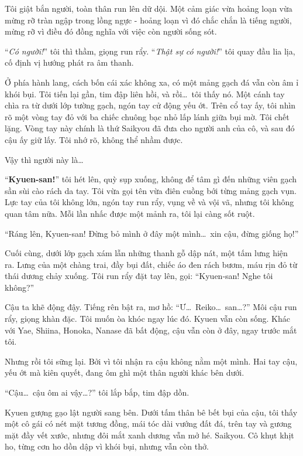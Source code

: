 \documentclass[../main.tex]{subfiles}
\begin{document}
Tôi giật bắn người, toàn thân run lên dữ dội. Một cảm giác vừa hoảng loạn vừa mừng rỡ tràn ngập trong lồng ngực - hoảng loạn vì đó chắc chắn là tiếng người, mừng rỡ vì điều đó đồng nghĩa với việc còn người sống sót.

``\textit{Có người!}'' tôi thì thầm, giọng run rẩy. ``\textit{Thật sự có người!}'' tôi quay đầu lia lịa, cố định vị hướng phát ra âm thanh.

Ở phía hành lang, cách bốn cái xác không xa, có một mảng gạch đá vẫn còn âm ỉ khói bụi. Tôi tiến lại gần, tim đập liên hồi, và rồi\dots\ tôi thấy nó. Một cánh tay chìa ra từ dưới lớp tường gạch, ngón tay cử động yếu ớt. Trên cổ tay ấy, tôi nhìn rõ một vòng tay đỏ với ba chiếc chuông bạc nhỏ lấp lánh giữa bụi mờ. Tôi chết lặng. Vòng tay này chính là thứ Saikyou đã đưa cho người anh của cô, và sau đó cậu ấy giữ lấy. Tôi nhớ rõ, không thể nhầm được.

Vậy thì người này là\dots

``\textbf{Kyuen-san!}'' tôi hét lên, quỳ sụp xuống, không để tâm gì đến những viên gạch sần sùi cào rách da tay. Tôi vừa gọi tên vừa điên cuồng bới từng mảng gạch vụn. Lực tay của tôi không lớn, ngón tay run rẩy, vụng về và vội vã, nhưng tôi không quan tâm nữa. Mỗi lần nhấc được một mảnh ra, tôi lại càng sốt ruột.

``Ráng lên, Kyuen-san! Đừng bỏ mình ở đây một mình\dots\ xin cậu, đừng giống họ!''

Cuối cùng, dưới lớp gạch xám lẫn những thanh gỗ dập nát, một tấm lưng hiện ra. Lưng của một chàng trai, đầy bụi đất, chiếc áo đen rách bươm, máu rịn đỏ từ thái dương chảy xuống. Tôi run rẩy đặt tay lên, gọi: ``Kyuen-san! Nghe tôi không?''

Cậu ta khẽ động đậy. Tiếng rên bật ra, mơ hồ: ``Ư\dots\ Reiko\dots\ san\dots?'' Môi cậu run rẩy, giọng khàn đặc. Tôi muốn òa khóc ngay lúc đó. Kyuen vẫn còn sống. Khác với Yae, Shiina, Honoka, Nanase đã bất động, cậu vẫn còn ở đây, ngay trước mắt tôi.

Nhưng rồi tôi sững lại. Bởi vì tôi nhận ra cậu không nằm một mình. Hai tay cậu, yếu ớt mà kiên quyết, đang ôm ghì một thân người khác bên dưới.

``Cậu\dots\ cậu ôm ai vậy\dots?'' tôi lắp bắp, tim đập dồn.

Kyuen gượng gạo lật người sang bên. Dưới tấm thân bê bết bụi của cậu, tôi thấy một cô gái có nét mặt tương đồng, mái tóc dài vướng đất đá, trên tay và gương mặt đầy vết xước, nhưng đôi mắt xanh dương vẫn mở hé. Saikyou. Cô khụt khịt ho, từng cơn ho dồn dập vì khói bụi, nhưng vẫn còn thở.
\end{document}
